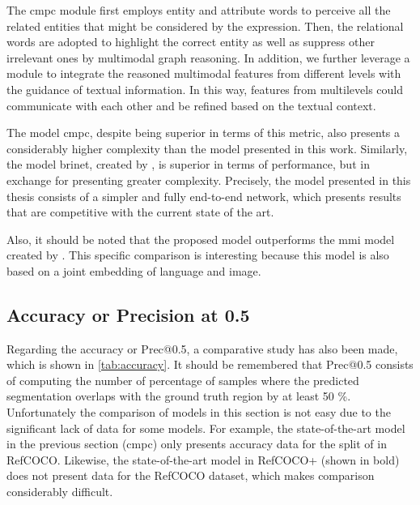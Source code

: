 \begin{quoteBox}
  The \gls{cmpc} module first employs entity and attribute words to perceive
  all the related entities that might be considered by the expression. Then,
  the relational words are adopted to highlight the correct entity as well as
  suppress other irrelevant ones by multimodal graph reasoning. In addition, we
  further leverage a module to integrate the reasoned multimodal features from
  different levels with the guidance of textual information. In this way,
  features from multilevels could communicate with each other and be refined
  based on the textual context. \tcblower
\end{quoteBox}

The model \gls{cmpc}, despite being superior in terms of this metric, also
presents a considerably higher complexity than the model presented in this
work. Similarly, the model \gls{brinet}, created by
, is superior in terms of performance,
but in exchange for presenting greater complexity. Precisely, the model
presented in this thesis consists of a simpler and fully end-to-end network,
which presents results that are competitive with the current state of the art.

Also, it should be noted that the proposed model outperforms the \gls{mmi}
model created by . This specific comparison is interesting
because this model is also based on a joint embedding of language and image.


\subsection{Accuracy or Precision at 0.5}\label{sec:accuracy}

Regarding the accuracy or Prec@0.5, a comparative study has also been made,
which is shown in \vref{tab:accuracy}. It should be remembered that Prec@0.5
consists of computing the number of percentage of samples where the predicted
segmentation overlaps with the ground truth region by at least 50
\%. Unfortunately the comparison of models in this section is not easy due to
the significant lack of data for some models. For example, the state-of-the-art
model in the previous section (\gls{cmpc}) only presents accuracy data for the
split of  in RefCOCO. Likewise, the state-of-the-art model in
RefCOCO+ (shown in bold) does not present data for the RefCOCO dataset, which
makes comparison considerably difficult.

